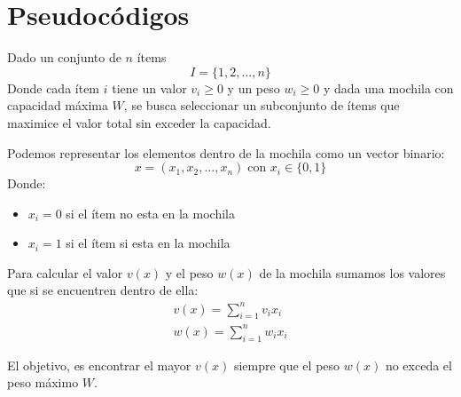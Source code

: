\documentclass[12pt,twoside]{article}
\begin{document}
	\clearpage
	\section{Pseudocódigos}
	
	Dado un conjunto de $n$ ítems \[I = \{1,2, \dots, n \}\] Donde cada ítem $i$ tiene un valor $v_i \geq 0$ y un peso $w_i \geq 0$ y dada una mochila con capacidad máxima $W$, se busca seleccionar un subconjunto de ítems que maximice el valor total sin exceder la capacidad.
	
	Podemos representar los elementos dentro de la mochila como un vector binario: 
	\[ x = (x_1, x_2, \dots , x_n) \; \text{con } x_i \in \{0, 1\} \]
	Donde:
	\begin{itemize}
		\item $x_i = 0$ si el ítem no esta en la mochila
		\item $x_i = 1$ si el ítem si esta en la mochila
	\end{itemize}
	
	Para calcular el valor $v(x)$ y el peso $w(x)$ de la mochila sumamos los valores que si se encuentren dentro de ella:
	\begin{gather*}
		v(x) = \sum_{i = 1}^{n} v_i x_i \\
		w(x) = \sum_{i = 1}^{n} w_i x_i 
	\end{gather*}
	
	El objetivo, es encontrar el mayor $v(x)$ siempre que el peso $w(x)$ no exceda el peso máximo $W$. 
	
\end{document}
